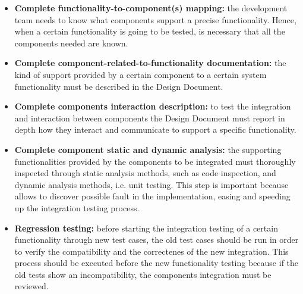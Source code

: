 \begin{itemize}
	\item \textbf{Complete functionality-to-component(s) mapping:} the development team needs to know what components support a precise functionality. Hence, when a certain functionality is going to be tested, is necessary that all the components needed are known.
	\item \textbf{Complete component-related-to-functionality documentation:} the kind of support provided by a certain component to a certain system functionality must be described in the Design Document.
	\item \textbf{Complete components interaction description:} to test the integration and interaction between components the Design Document must report in depth how they interact and communicate to support a specific functionality.
	\item \textbf{Complete component static and dynamic analysis:} the supporting functionalities provided by the components to be integrated must thoroughly inspected through static analysis methods, such as code inspection, and dynamic analysis methods, i.e. unit testing. This step is important because allows to discover possible fault in the implementation, easing and speeding up the integration testing process.
	\item \textbf{Regression testing:} before starting the integration testing of a certain functionality through new test cases, the old test cases should be run in order to verify the compatibility and the correctenes of the new integration. This process should be executed before the new functionality testing because if the old tests show an incompatibility, the components integration must be reviewed.
\end{itemize}

